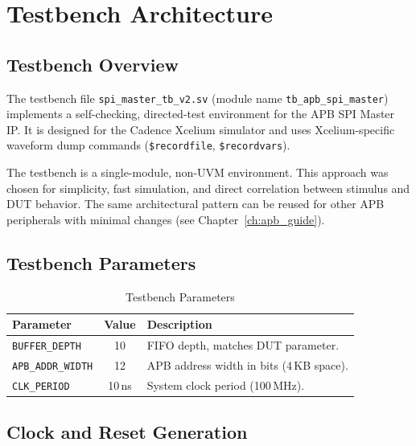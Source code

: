 \chapter{Testbench Architecture}
\label{ch:tb_arch}

\section{Testbench Overview}

The testbench file \texttt{spi\_master\_tb\_v2.sv} (module name \texttt{tb\_apb\_spi\_master})
implements a self-checking, directed-test environment for the APB SPI Master IP. It is designed
for the Cadence Xcelium simulator and uses Xcelium-specific waveform dump commands
(\texttt{\$recordfile}, \texttt{\$recordvars}).

The testbench is a single-module, non-UVM environment. This approach was chosen for simplicity,
fast simulation, and direct correlation between stimulus and DUT behavior. The same architectural
pattern can be reused for other APB peripherals with minimal changes (see Chapter~\ref{ch:apb_guide}).

\section{Testbench Parameters}

\begin{table}[H]
\centering
\caption{Testbench Parameters}
\label{tab:tb_params}
\begin{tabularx}{\textwidth}{@{}lcX@{}}
\toprule
\textbf{Parameter} & \textbf{Value} & \textbf{Description} \\
\midrule
\texttt{BUFFER\_DEPTH}   & 10    & FIFO depth, matches DUT parameter. \\
\texttt{APB\_ADDR\_WIDTH} & 12   & APB address width in bits (4\,KB space). \\
\texttt{CLK\_PERIOD}      & 10\,ns & System clock period (100\,MHz). \\
\bottomrule
\end{tabularx}
\end{table}

\section{Clock and Reset Generation}

